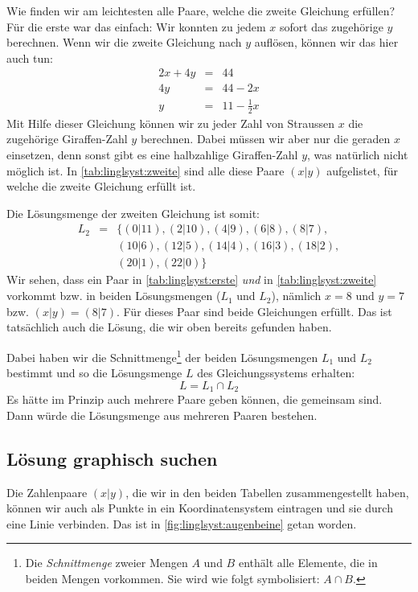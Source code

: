 \documentclass[%
11pt,%
twoside,%
titlepage,%
german,%
]{scrartcl}
\begin{document}
Wie finden wir am leichtesten alle Paare, welche die zweite Gleichung erf\"ullen? F\"ur die erste war das einfach: Wir konnten zu jedem $x$ sofort das zugeh\"orige $y$ berechnen. Wenn wir die zweite Gleichung nach $y$ aufl\"osen, k\"onnen wir das hier auch tun:
\begin{eqnarray*}
  2x + 4y & = & 44 \\
  4y & = & 44 - 2x \\
  y & = & 11 - \frac{1}{2}x
\end{eqnarray*}
Mit Hilfe dieser Gleichung k\"onnen wir zu jeder Zahl von Straussen $x$ die zugeh\"orige Giraffen-Zahl $y$ berechnen. Dabei m\"ussen wir aber nur die geraden $x$ einsetzen, denn sonst gibt es eine halbzahlige Giraffen-Zahl $y$, was nat\"urlich nicht m\"oglich ist. In \ref{tab:linglsyst:zweite} sind alle diese Paare $(x|y)$ aufgelistet, f\"ur welche die zweite Gleichung erf\"ullt ist.

Die L\"osungsmenge der zweiten Gleichung ist somit:
\begin{eqnarray*}
  L_2 & = & \{(0|11),(2|10),(4|9),(6|8),(8|7), \\
  & & (10|6),(12|5),(14|4),(16|3),(18|2), \\
  & & (20|1),(22|0)\}
\end{eqnarray*}
Wir sehen, dass ein Paar in \ref{tab:linglsyst:erste} \emph{und} in \ref{tab:linglsyst:zweite} vorkommt bzw. in beiden L\"osungsmengen ($L_1$ und $L_2$), n\"amlich $x=8$ und $y=7$ bzw. $(x|y)=(8|7)$. F\"ur dieses Paar sind beide Gleichungen erf\"ullt. Das ist tats\"achlich auch die L\"osung, die wir oben bereits gefunden haben.

Dabei haben wir die Schnittmenge\footnote{Die \emph{Schnittmenge} zweier Mengen $A$ und $B$ enth\"alt alle Elemente, die in beiden Mengen vorkommen. Sie wird wie folgt symbolisiert: $A\cap B$.} der beiden L\"osungsmengen $L_1$ und $L_2$ bestimmt und so die L\"osungsmenge $L$ des Gleichungssystems erhalten:
\begin{displaymath}
  L = L_1 \cap L_2
\end{displaymath}
Es h\"atte im Prinzip auch mehrere Paare geben k\"onnen, die gemeinsam sind. Dann w\"urde die L\"osungsmenge aus mehreren Paaren bestehen.


\subsection{Lösung graphisch suchen}
\label{linglsyst:graphisch}

Die Zahlenpaare $(x|y)$, die wir in den beiden Tabellen zusammengestellt haben, k\"onnen wir auch als Punkte in ein Koordinatensystem eintragen und sie durch eine Linie verbinden. Das ist in \ref{fig:linglsyst:augenbeine} getan worden.
\end{document}
